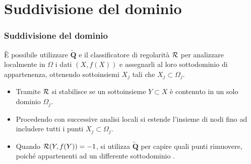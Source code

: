 \documentclass[10pt]{beamer}
\theoremstyle{definition}
\theoremstyle{plain}
\def\R{\mathbb R}
\def\Cal#1{{\cal #1}}
\def\line#1{\hbox to\hsize{#1}}
\begin{document}
\section{Suddivisione del dominio}
\begin{frame}
\frametitle{Suddivisione del dominio}


È possibile utilizzare $\widetilde{\bm Q}$ e il classificatore di regolarità $\Cal R$ per analizzare localmente in $\Omega$ i dati $(X, f(X))$ e assegnarli al loro sottodominio di appartenenza, ottenendo sottoinsiemi $X_j$ tali che $X_j\subset \Omega_j$.

\medskip

\begin{itemize} 
\item
Tramite $\Cal R$ si stabilisce se un sottoinsieme $Y \subset X$ è contenuto in un solo dominio $\Omega_j$.

\medskip

\item
Procedendo con successive analisi locali si  estende l’insieme di nodi fino ad includere tutti i punti $X_j\subset\Omega_j$.

\medskip

\item
Quando $\Cal R(Y, f(Y)) = -1$, si utilizza $\widetilde{\bm Q}$ per capire quali punti rimuovere, poiché  appartenenti ad un differente  sottodominio .
\end{itemize}
\end{frame}


\end{document}

